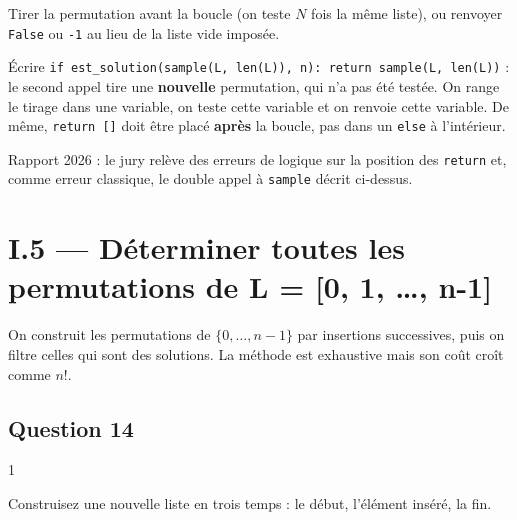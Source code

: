 \documentclass[11pt,a4paper]{article}
\begin{document}
\begin{piege}

Tirer la permutation avant la boucle (on teste \(N\) fois la même liste), ou renvoyer \texttt{False} ou \texttt{-1} au lieu de la liste vide imposée.

\end{piege}

\begin{piege}

Écrire \texttt{if\ est\_solution(\allowbreak{}sample(\allowbreak{}L,\allowbreak{}\ len(\allowbreak{}L)\allowbreak{})\allowbreak{},\allowbreak{}\ n)\allowbreak{}:\allowbreak{}\ return\ sample(\allowbreak{}L,\allowbreak{}\ len(\allowbreak{}L)\allowbreak{})\allowbreak{}} : le second appel tire une \textbf{nouvelle} permutation, qui n'a pas été testée. On range le tirage dans une variable, on teste cette variable et on renvoie cette variable. De même, \texttt{return\ {[}{]}} doit être placé \textbf{après} la boucle, pas dans un \texttt{else} à l'intérieur.

\end{piege}

\begin{jury}

Rapport 2026 : le jury relève des erreurs de logique sur la position des \texttt{return} et, comme erreur classique, le double appel à \texttt{sample} décrit ci-dessus.

\end{jury}

\hypertarget{i.5-duxe9terminer-toutes-les-permutations-de-l-0-1-n-1}{%
\section{I.5 --- Déterminer toutes les permutations de L = {[}0, 1, \ldots, n-1{]}}\label{i.5-duxe9terminer-toutes-les-permutations-de-l-0-1-n-1}}

On construit les permutations de \(\{0, \dots, n-1\}\) par insertions successives, puis on filtre celles qui sont des solutions. La méthode est exhaustive mais son coût croît comme \(n!\).

\hypertarget{question-14}{%
\subsection{Question 14}\label{question-14}}

\begin{indication}{1}

Construisez une nouvelle liste en trois temps : le début, l'élément inséré, la fin.

\end{indication}
\end{document}
